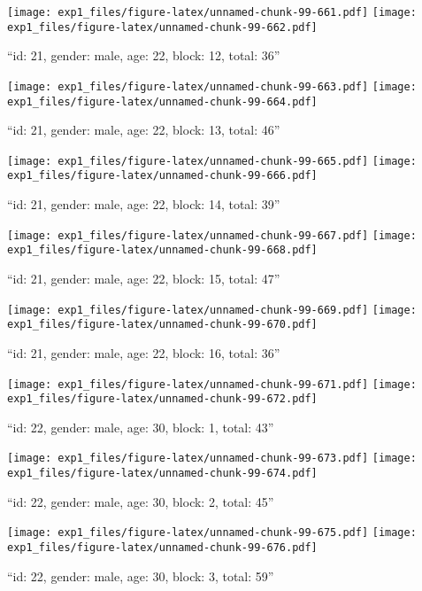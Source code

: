 \documentclass[,]{article}
\begin{document}
\texttt{[image: exp1\_files/figure-latex/unnamed-chunk-99-661.pdf]}
\texttt{[image: exp1\_files/figure-latex/unnamed-chunk-99-662.pdf]}

\newpage
[1] 

``id: 21, gender: male, age: 22, block: 12, total: 36''

\texttt{[image: exp1\_files/figure-latex/unnamed-chunk-99-663.pdf]}
\texttt{[image: exp1\_files/figure-latex/unnamed-chunk-99-664.pdf]}

\newpage
[1] 

``id: 21, gender: male, age: 22, block: 13, total: 46''

\texttt{[image: exp1\_files/figure-latex/unnamed-chunk-99-665.pdf]}
\texttt{[image: exp1\_files/figure-latex/unnamed-chunk-99-666.pdf]}

\newpage
[1] 

``id: 21, gender: male, age: 22, block: 14, total: 39''

\texttt{[image: exp1\_files/figure-latex/unnamed-chunk-99-667.pdf]}
\texttt{[image: exp1\_files/figure-latex/unnamed-chunk-99-668.pdf]}

\newpage
[1] 

``id: 21, gender: male, age: 22, block: 15, total: 47''

\texttt{[image: exp1\_files/figure-latex/unnamed-chunk-99-669.pdf]}
\texttt{[image: exp1\_files/figure-latex/unnamed-chunk-99-670.pdf]}

\newpage
[1] 

``id: 21, gender: male, age: 22, block: 16, total: 36''

\texttt{[image: exp1\_files/figure-latex/unnamed-chunk-99-671.pdf]}
\texttt{[image: exp1\_files/figure-latex/unnamed-chunk-99-672.pdf]}

\newpage
[1] 

``id: 22, gender: male, age: 30, block: 1, total: 43''

\texttt{[image: exp1\_files/figure-latex/unnamed-chunk-99-673.pdf]}
\texttt{[image: exp1\_files/figure-latex/unnamed-chunk-99-674.pdf]}

\newpage
[1] 

``id: 22, gender: male, age: 30, block: 2, total: 45''

\texttt{[image: exp1\_files/figure-latex/unnamed-chunk-99-675.pdf]}
\texttt{[image: exp1\_files/figure-latex/unnamed-chunk-99-676.pdf]}

\newpage
[1] 

``id: 22, gender: male, age: 30, block: 3, total: 59''
\end{document}
